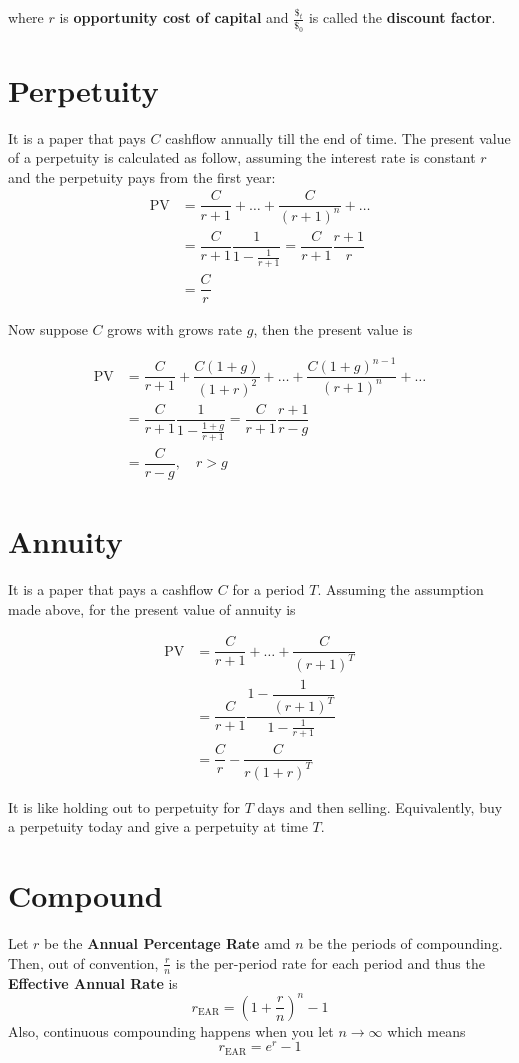 where \(r\) is \textbf{opportunity cost of capital} and \(\frac{\$_t}{\$_0}\) is called the \textbf{discount factor}.

\section{Perpetuity}
It is a paper that pays \(C\) cashflow annually till the end of time. The present value of a perpetuity is calculated as follow, assuming the interest rate is constant \(r\) and the perpetuity pays from the first year:
\begin{align*}
    \mathrm{PV} &= \dfrac{C}{r + 1} + \dots + \dfrac{C}{(r + 1)^n} + \dots \\
    &= \dfrac{C}{r + 1} \dfrac{1}{1 - \frac{1}{r + 1}} = \dfrac{C}{r + 1} \dfrac{r + 1}{r} \\
    &= \dfrac{C}{r}
\end{align*}

Now suppose \(C\) grows with grows rate \(g\), then the present value is 

\begin{align*}
    \mathrm{PV} &= \dfrac{C}{r + 1}  + \dfrac{C (1+g)}{(1+r)^2}+ \dots + \dfrac{C (1 + g)^{n-1}}{(r + 1)^n} + \dots \\
    &= \dfrac{C}{r + 1} \dfrac{1}{1 - \frac{1 + g}{r + 1}} = \dfrac{C}{r + 1} \dfrac{r + 1}{r - g} \\
    &= \dfrac{C}{r - g} , \quad r > g
\end{align*}

\section{Annuity}
It is a paper that pays a cashflow \(C\) for a period \(T\). Assuming the assumption made above, for the present value of annuity is 

\begin{align*}
    \mathrm{PV} &= \dfrac{C}{r + 1} + \dots + \dfrac{C}{(r + 1)^T}\\
    &= \dfrac{C}{r + 1} \dfrac{1 - \dfrac{1}{(r + 1)^T}}{1 - \frac{1}{r + 1}} \\
    &= \dfrac{C}{r} - \dfrac{C}{r (1 + r)^T}
\end{align*}

It is like holding out to perpetuity for \(T\) days and then selling. Equivalently, buy a perpetuity today and give a perpetuity at time \(T\). 

\section{Compound}
Let \(r\) be the \textbf{Annual Percentage Rate} amd \(n\) be the periods of compounding. Then, out of convention, \(\frac{r}{n}\) is the per-period rate for each period and thus the \textbf{Effective Annual Rate} is 
\begin{equation*}
    r_{\mathrm{EAR}} = \left( 1+ \dfrac{r}{n} \right)^n - 1
\end{equation*}
Also, continuous compounding happens when you let \(n \to \infty\) which means 
\begin{equation*}
    r_{\mathrm{EAR}} =e^r - 1
\end{equation*}

